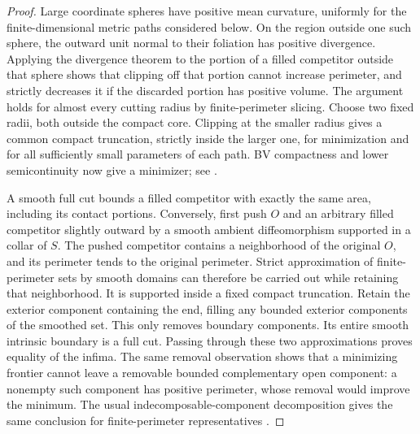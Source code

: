 \begin{proof}
Large coordinate spheres have positive mean curvature, uniformly for
the finite-dimensional metric paths considered below.  On the region
outside one such sphere, the outward unit normal to their foliation
has positive divergence.  Applying the divergence theorem to the
portion of a filled competitor outside that sphere shows that clipping
off that portion cannot increase perimeter, and strictly decreases it
if the discarded portion has positive volume.  The argument holds for
almost every cutting radius by finite-perimeter slicing.  Choose two
fixed radii, both outside the compact core.  Clipping at the smaller
radius gives a common compact truncation, strictly inside the larger
one, for minimization and for all sufficiently small parameters of
each path.  BV compactness and lower semicontinuity now give a
minimizer; see \cite{AmbrosioFuscoPallara2000}.

A smooth full cut bounds a filled competitor with exactly the same
area, including its contact portions.  Conversely, first push $O$ and
an arbitrary filled competitor slightly outward by a smooth ambient
diffeomorphism supported in a collar of $S$.  The pushed competitor
contains a neighborhood of the original $O$, and its perimeter tends
to the original perimeter.  Strict approximation of finite-perimeter
sets by smooth domains can therefore be carried out while retaining
that neighborhood.  It is supported inside a fixed compact
truncation.  Retain the exterior component containing the end, filling
any bounded exterior components of the smoothed set.  This only
removes boundary components.  Its entire smooth intrinsic boundary is
a full cut.  Passing through these two approximations proves equality
of the infima.  The same removal observation shows that a minimizing
frontier cannot leave a removable bounded complementary open
component: a nonempty such component has positive perimeter, whose
removal would improve the minimum.  The usual indecomposable-component
decomposition gives the same conclusion for finite-perimeter
representatives \cite{AmbrosioFuscoPallara2000}.


\end{proof}
